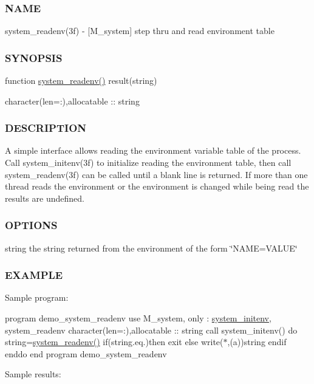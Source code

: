 \subsubsection*{N\+A\+ME}

system\+\_\+readenv(3f) -\/ \mbox{[}M\+\_\+system\mbox{]} step thru and read environment table \subsubsection*{S\+Y\+N\+O\+P\+S\+IS}

function \hyperlink{namespacem__system_ae0e43010a82a6a25402568ccb326322d}{system\+\_\+readenv()} result(string)

character(len=\+:),allocatable \+:\+: string \subsubsection*{D\+E\+S\+C\+R\+I\+P\+T\+I\+ON}

A simple interface allows reading the environment variable table of the process. Call system\+\_\+initenv(3f) to initialize reading the environment table, then call system\+\_\+readenv(3f) can be called until a blank line is returned. If more than one thread reads the environment or the environment is changed while being read the results are undefined. \subsubsection*{O\+P\+T\+I\+O\+NS}

string the string returned from the environment of the form \char`\"{}\+N\+A\+M\+E=\+V\+A\+L\+U\+E\char`\"{}

\subsubsection*{E\+X\+A\+M\+P\+LE}

Sample program\+:

program demo\+\_\+system\+\_\+readenv use M\+\_\+system, only \+: \hyperlink{interfacem__system_1_1system__initenv}{system\+\_\+initenv}, system\+\_\+readenv character(len=\+:),allocatable \+:\+: string call system\+\_\+initenv() do string=\hyperlink{namespacem__system_ae0e43010a82a6a25402568ccb326322d}{system\+\_\+readenv()} if(string.\+eq.\textquotesingle{}\textquotesingle{})then exit else write($\ast$,\textquotesingle{}(a)\textquotesingle{})string endif enddo end program demo\+\_\+system\+\_\+readenv

Sample results\+:

